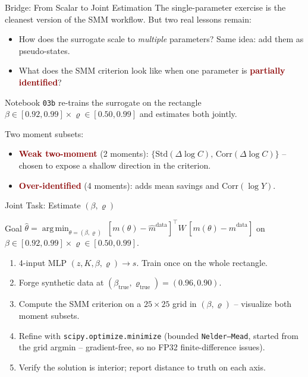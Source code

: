 \documentclass[10pt,aspectratio=169]{beamer}
\newcommand{\emphc}[1]{\textbf{\textcolor{darkred}{#1}}}
\DeclareMathOperator*{\argmin}{arg\,min}
\begin{document}
\begin{frame}{Bridge: From Scalar to Joint Estimation}
\small
The single-parameter exercise is the cleanest version of the SMM workflow. But two real lessons remain:
\begin{itemize}
\itemsep1pt
  \item How does the surrogate scale to \emph{multiple} parameters? Same idea: add them as pseudo-states.
  \item What does the SMM criterion look like when one parameter is \emphc{partially identified}?
\end{itemize}
\vspace{0.1cm}
Notebook \texttt{03b} re-trains the surrogate on the rectangle $\beta \in [0.92, 0.99] \times \varrho \in [0.50, 0.99]$ and estimates both jointly.

\vspace{0.2cm}
Two moment subsets:
\begin{itemize}
  \item \emphc{Weak two-moment} (2 moments): $\{\mathrm{Std}(\Delta\log C),\,\mathrm{Corr}(\Delta\log C)\}$ -- chosen to expose a shallow direction in the criterion.
  \item \emphc{Over-identified} (4 moments): adds mean savings and $\mathrm{Corr}(\log Y)$.
\end{itemize}
\end{frame}

\begin{frame}{Joint Task: Estimate $(\beta, \varrho)$}
\begin{block}{Goal}
$\hat\theta = \argmin_{\theta = (\beta,\varrho)}\; [m(\theta) - \hat{m}^{\mathrm{data}}]^\top W\, [m(\theta) - \hat{m}^{\mathrm{data}}]$ \quad on $\beta\in[0.92,0.99] \times \varrho\in[0.50, 0.99]$.
\end{block}
\begin{enumerate}
  \itemsep1pt
  \item 4-input MLP $(z, K, \beta, \varrho) \to s$. Train once on the whole rectangle.
  \item Forge synthetic data at $(\beta_{\text{true}}, \varrho_{\text{true}}) = (0.96, 0.90)$.
  \item Compute the SMM criterion on a $25\times 25$ grid in $(\beta, \varrho)$ -- visualize both moment subsets.
  \item Refine with \texttt{scipy.optimize.minimize} (bounded \texttt{Nelder--Mead}, started from the grid argmin -- gradient-free, so no FP32 finite-difference issues).
  \item Verify the solution is interior; report distance to truth on each axis.
\end{enumerate}
\end{frame}
\end{document}

